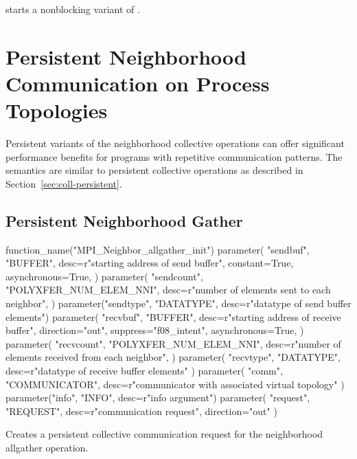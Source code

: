  starts a nonblocking variant of
.

\section[Persistent Neighborhood Communication]{Persistent Neighborhood Communication on Process Topologies}
\label{sec:sparsecoll-pnbc}

Persistent variants of the neighborhood collective operations can offer
significant performance benefits for programs with repetitive communication
patterns. The semantics are similar to persistent collective
operations as described in Section~\ref{sec:coll-persistent}. 

\subsection{Persistent Neighborhood Gather}

\begin{mpi-binding}
    function_name("MPI_Neighbor_allgather_init")
    parameter(
        "sendbuf",
        "BUFFER",
        desc=r"starting address of send buffer",
        constant=True,
        asynchronous=True,
    )
    parameter(
        "sendcount",
        "POLYXFER_NUM_ELEM_NNI",
        desc=r"number of elements sent to each neighbor",
    )
    parameter("sendtype", "DATATYPE", desc=r"datatype of send buffer elements")
    parameter(
        "recvbuf",
        "BUFFER",
        desc=r"starting address of receive buffer",
        direction="out",
        suppress="f08_intent",
        asynchronous=True,
    )
    parameter(
        "recvcount",
        "POLYXFER_NUM_ELEM_NNI",
        desc=r"number of elements received from each neighbor",
    )
    parameter(
        "recvtype", "DATATYPE", desc=r"datatype of receive buffer elements"
    )
    parameter(
        "comm", "COMMUNICATOR", desc=r"communicator with associated virtual topology"
    )
    parameter("info", "INFO", desc=r"info argument")
    parameter(
        "request", "REQUEST", desc=r"communication request", direction="out"
    )
\end{mpi-binding}

Creates a persistent collective communication request for the neighborhood allgather operation. 

